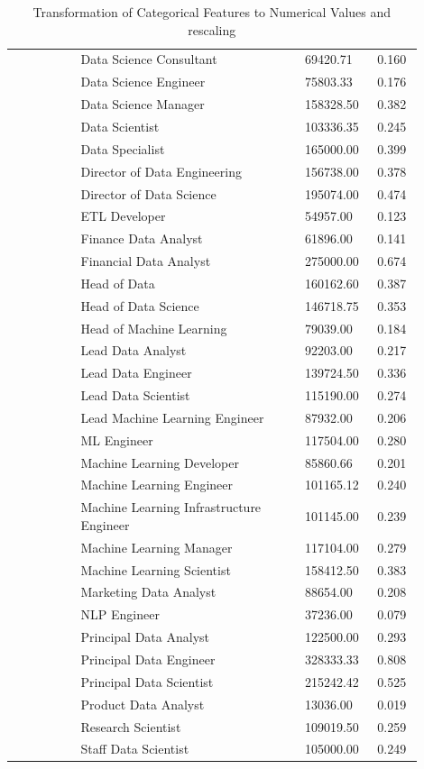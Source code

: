 \documentclass[11pt,a4paper]{article}
\begin{document}
\begin{table}
\begin{tabular}{p{0.15\linewidth}|p{0.50\linewidth}|p{0.15\linewidth}|p{0.10\linewidth}}
&Data Science Consultant&69420.71&0.160\\
&Data Science Engineer&75803.33&0.176\\
&Data Science Manager&158328.50&0.382\\
&Data Scientist&103336.35&0.245\\
&Data Specialist&165000.00&0.399\\
&Director of Data Engineering&156738.00&0.378\\
&Director of Data Science&195074.00&0.474\\
&ETL Developer&54957.00&0.123\\
&Finance Data Analyst&61896.00&0.141\\
&Financial Data Analyst&275000.00&0.674\\
&Head of Data&160162.60&0.387\\
&Head of Data Science&146718.75&0.353\\
&Head of Machine Learning&79039.00&0.184\\
&Lead Data Analyst&92203.00&0.217\\
&Lead Data Engineer&139724.50&0.336\\
&Lead Data Scientist&115190.00&0.274\\
&Lead Machine Learning Engineer&87932.00&0.206\\
&ML Engineer&117504.00&0.280\\
&Machine Learning Developer&85860.66&0.201\\
&Machine Learning Engineer&101165.12&0.240\\
&Machine Learning Infrastructure Engineer&101145.00&0.239\\
&Machine Learning Manager&117104.00&0.279\\
&Machine Learning Scientist&158412.50&0.383\\
&Marketing Data Analyst&88654.00&0.208\\
&NLP Engineer&37236.00&0.079\\
&Principal Data Analyst&122500.00&0.293\\
&Principal Data Engineer&328333.33&0.808\\
&Principal Data Scientist&215242.42&0.525\\
&Product Data Analyst&13036.00&0.019\\
&Research Scientist&109019.50&0.259\\
&Staff Data Scientist&105000.00&0.249\\
\hline\end{tabular}
\caption{Transformation of Categorical Features to Numerical Values and rescaling}
\label{tab:Transformation of Categorical Features to Numerical Values}
\end{table}
\end{document}
